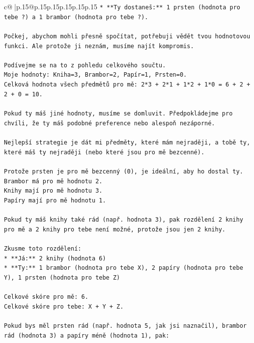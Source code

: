 \documentclass{article}
\begin{document}
{\begin{supertabular}{c@{$\;$}|p{.15\linewidth}@{}p{.15\linewidth}p{.15\linewidth}p{.15\linewidth}p{.15\linewidth}p{.15\linewidth}}
{{{\texttt{*   **Ty dostaneš:** 1 prsten (hodnota pro tebe ?) a 1 brambor (hodnota pro tebe ?).} \\
\\ 
\texttt{Počkej, abychom mohli přesně spočítat, potřebuji vědět tvou hodnotovou funkci. Ale protože ji neznám, musíme najít kompromis.} \\
\\ 
\texttt{Podívejme se na to z pohledu celkového součtu.} \\
\texttt{Moje hodnoty: Kniha=3, Brambor=2, Papír=1, Prsten=0.} \\
\texttt{Celková hodnota všech předmětů pro mě: 2*3 + 2*1 + 1*2 + 1*0 = 6 + 2 + 2 + 0 = 10.} \\
\\ 
\texttt{Pokud ty máš jiné hodnoty, musíme se domluvit. Předpokládejme pro chvíli, že ty máš podobné preference nebo alespoň nezáporné.} \\
\\ 
\texttt{Nejlepší strategie je dát mi předměty, které mám nejraději, a tobě ty, které máš ty nejraději (nebo které jsou pro mě bezcenné).} \\
\\ 
\texttt{Protože prsten je pro mě bezcenný (0), je ideální, aby ho dostal ty.} \\
\texttt{Brambor má pro mě hodnotu 2.} \\
\texttt{Knihy mají pro mě hodnotu 3.} \\
\texttt{Papíry mají pro mě hodnotu 1.} \\
\\ 
\texttt{Pokud ty máš knihy také rád (např. hodnota 3), pak rozdělení 2 knihy pro mě a 2 knihy pro tebe není možné, protože jsou jen 2 knihy.} \\
\\ 
\texttt{Zkusme toto rozdělení:} \\
\texttt{*   **Já:** 2 knihy (hodnota 6)} \\
\texttt{*   **Ty:** 1 brambor (hodnota pro tebe X), 2 papíry (hodnota pro tebe Y), 1 prsten (hodnota pro tebe Z)} \\
\\ 
\texttt{Celkové skóre pro mě: 6.} \\
\texttt{Celkové skóre pro tebe: X + Y + Z.} \\
\\ 
\texttt{Pokud bys měl prsten rád (např. hodnota 5, jak jsi naznačil), brambor rád (hodnota 3) a papíry méně (hodnota 1), pak:} \\
}}}
\end{supertabular}}
\end{document}
